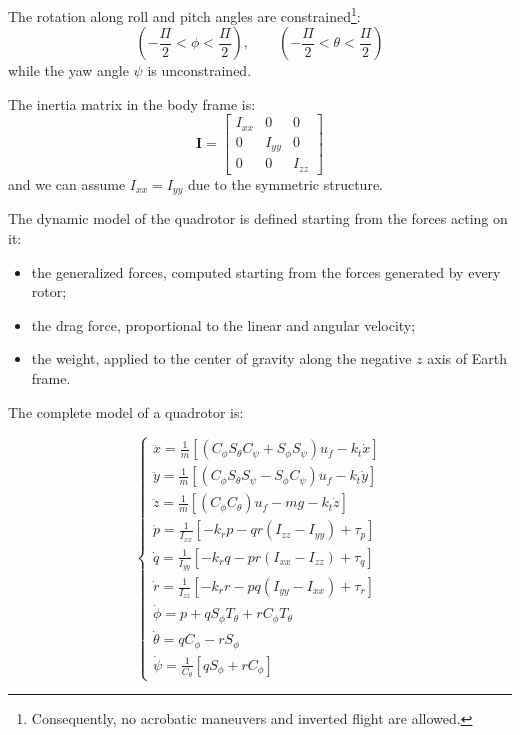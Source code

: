 \documentclass[11pt,a4paper]{scrartcl}
\begin{document}
The rotation along roll and pitch angles are constrained\footnote{Consequently, no acrobatic maneuvers and inverted flight are allowed.}:
\begin{equation*}
	(-\frac{\Pi}{2}<\phi<\frac{\Pi}{2}), \qquad (-\frac{\Pi}{2}<\theta<\frac{\Pi}{2})
\end{equation*}
while the yaw angle $ \psi $ is unconstrained.

The inertia matrix in the body frame is:
\begin{equation*}
	\mathbf{I}=
	\begin{bmatrix}
	I_{xx} & 0 & 0 \\
	0 & I_{yy} & 0 \\
	0 & 0 & I_{zz} 
	\end{bmatrix}
\end{equation*}
and we can assume $ I_{xx} = I_{yy} $ due to the symmetric structure.

The  dynamic model of the quadrotor is defined starting from the forces acting on it:
\begin{itemize}
	\item the generalized forces, computed starting from the forces generated by every rotor;
	\item the drag force, proportional to the linear and angular velocity;
	\item the weight, applied to the center of gravity along the negative $ z $ axis of Earth frame.
\end{itemize}

The complete model of a quadrotor is:

\begin{equation}
\begin{cases}
\ddot{x} = \frac{1}{m}[(C_{\phi}S_{\theta}C_{\psi} + S_{\phi}S_{\psi})u_f-k_t \dot{x}] \\
\ddot{y} = \frac{1}{m}[(C_{\phi}S_{\theta}S_{\psi} - S_{\phi}C_{\psi})u_f-k_t \dot{y}] \\
\ddot{z} = \frac{1}{m}[(C_{\phi}C_{\theta})u_f- mg - k_t \dot{z}] \\
\dot{p} = \frac{1}{I_{xx}}[-k_r p - qr(I_{zz}-I_{yy})+\tau_p]  \\
\dot{q} = \frac{1}{I_{yy}}[-k_r q - pr(I_{xx}-I_{zz})+\tau_q]  \\
\dot{r} = \frac{1}{I_{zz}}[-k_r r - pq(I_{yy}-I_{xx})+\tau_r]  \\
\dot{\phi} = p + q S_{\phi}T_{\theta} + r C_{\phi}T_{\theta} \\
\dot{\theta} = q C_{\phi} - rS_{\phi} \\
\dot{\psi} = \frac{1}{C_{\theta}}[qS_{\phi}+rC_{\phi}]
\end{cases}
\label{quad_model_eqs}
\end{equation}
\end{document}
